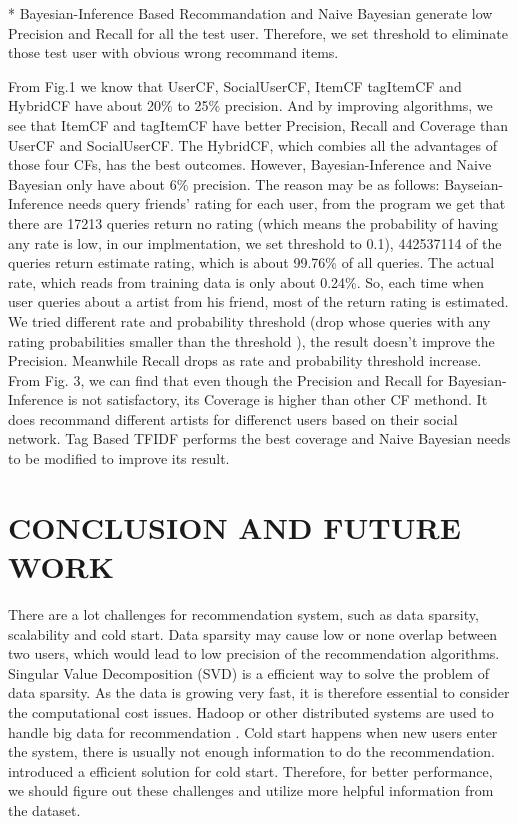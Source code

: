 \documentclass{sig-alternate}
\begin{document}
* Bayesian-Inference Based Recommandation and Naive Bayesian generate low Precision and Recall for all the test user.  Therefore, we set threshold to eliminate those test user with obvious wrong recommand items.  

From Fig.1 we know that UserCF, SocialUserCF, ItemCF tagItemCF and HybridCF have about 20\% to 25\% precision.  And by improving algorithms, we see that ItemCF and tagItemCF have better Precision, Recall and Coverage than UserCF and SocialUserCF. The HybridCF, which combies all the advantages of those four CFs, has the best outcomes.  However, Bayesian-Inference and Naive Bayesian only have about 6\% precision.  The reason may be as follows:  Bayseian-Inference needs query friends' rating for each user, from the program we get that there are 17213 queries return no rating (which means the probability of having any rate is low, in our implmentation, we set threshold to 0.1),  442537114 of the queries return estimate rating, which is about 99.76\% of all queries. The actual rate, which reads from training data is only about 0.24\%.  So, each time when user queries about a artist from his friend,  most of the return rating is estimated.  We tried different rate and probability threshold (drop whose queries with any rating probabilities smaller than the threshold ), the result doesn't improve the Precision. Meanwhile Recall drops as rate and probability threshold increase.  From Fig. 3, we can find that even though the Precision and Recall for Bayesian-Inference is not satisfactory, its Coverage is higher than other CF methond.  It does recommand different artists for differenct users based on their social network.  Tag Based TFIDF performs the best coverage and Naive Bayesian needs to be modified to improve its result.








\section{CONCLUSION AND FUTURE WORK}
There are a lot challenges for recommendation system, such as data sparsity, scalability and cold start. Data sparsity may cause low or none overlap between two users, which would lead to low precision of the recommendation algorithms. Singular Value Decomposition (SVD) \cite{svd} is a efficient way to solve the problem of data sparsity.
As the data is growing very fast, it is therefore essential to consider the computational cost issues. Hadoop or other distributed systems are used to handle big data for recommendation \cite{hadoop}.
Cold start happens when new users enter the system, there is usually not enough information to do the recommendation. \cite{cold} introduced a efficient solution for cold start.
Therefore, for better performance, we should figure out these challenges and utilize more helpful information from the dataset.
\end{document}
